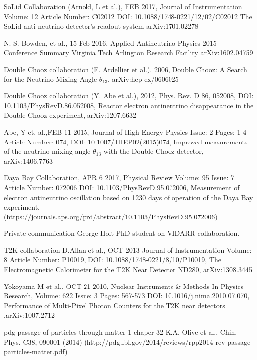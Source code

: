 \documentclass[12pt,a4paper]{article}
\begin{document}
\begin{thebibliography}{9}
SoLid Collaboration (Arnold, L et al.), FEB 2017, Journal of Instrumentation Volume: 12 Article Number: C02012 DOI: 10.1088/1748-0221/12/02/C02012 The SoLid anti-neutrino detector's readout system arXiv:1701.02278

N. S. Bowden, et al., 15 Feb 2016, Applied Antineutrino Physics 2015 -- Conference Summary Virginia Tech Arlington Research Facility arXiv:1602.04759 

Double Chooz collaboration (F. Ardellier et al.), 2006, Double Chooz: A Search for the Neutrino Mixing Angle $\theta_{13}$, arXiv:hep-ex/0606025

Double Chooz collaboration (Y. Abe et al.), 2012, Phys. Rev. D 86, 052008, DOI: 10.1103/PhysRevD.86.052008, Reactor electron antineutrino disappearance in the Double Chooz experiment, arXiv:1207.6632

Abe, Y et. al.,FEB 11 2015, Journal of High Energy Physics Issue: 2  Pages: 1-4 Article Number: 074, DOI: 10.1007/JHEP02(2015)074, Improved measurements of the neutrino mixing angle $\theta_{13}$ with the Double Chooz detector, arXiv:1406.7763 

Daya Bay Collaboration, APR 6 2017, Physical Review Volume: 95  Issue: 7 Article Number: 072006 DOI: 10.1103/PhysRevD.95.072006, Measurement of electron antineutrino oscillation based on 1230 days of operation of the Daya Bay experiment, (https://journals.aps.org/prd/abstract/10.1103/PhysRevD.95.072006)

Private communication George Holt PhD student on VIDARR collaboration. 

T2K collaboration D.Allan et al., OCT 2013 Journal of Instrumentation Volume: 8 Article Number: P10019, DOI: 10.1088/1748-0221/8/10/P10019, The Electromagnetic Calorimeter for the T2K Near Detector ND280,	arXiv:1308.3445

Yokoyama M et al., OCT 21 2010, Nuclear Instruments \& Methods In Physics Research, Volume: 622  Issue: 3  Pages: 567-573 DOI: 10.1016/j.nima.2010.07.070, Performance of Multi-Pixel Photon Counters for the T2K near detectors ,arXiv:1007.2712

pdg passage of particles through matter 1 chaper 32  K.A. Olive et al., Chin. Phys. C38, 090001 (2014) (http://pdg.lbl.gov/2014/reviews/rpp2014-rev-passage-particles-matter.pdf)


\end{thebibliography}
\end{document}
